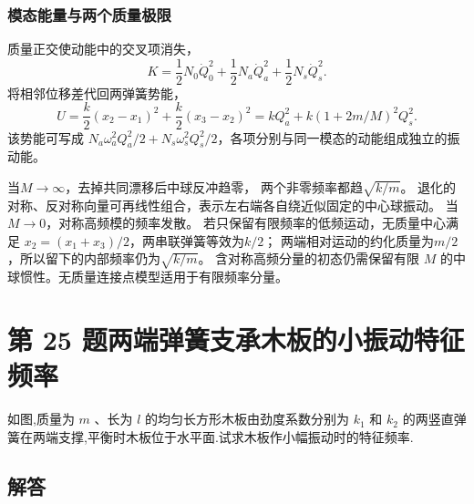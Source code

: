 \documentclass[UTF8,fontset=fandol,a4paper,11pt]{ctexart}
\newcommand{\tagline}[1]{\noindent{\small\color{muted}#1}\par}
\newcommand{\figcaption}[1]{\par\vspace{2pt}{\small\color{muted}#1}\par}
\begin{document}
\subsubsection*{模态能量与两个质量极限}
质量正交使动能中的交叉项消失，
\[
K=\frac12N_0\dot Q_0^2+\frac12N_a\dot Q_a^2+\frac12N_s\dot Q_s^2.
\]
将相邻位移差代回两弹簧势能，
\[
U=\frac k2(x_2-x_1)^2+\frac k2(x_3-x_2)^2
=kQ_a^2+k(1+2m/M)^2Q_s^2.
\]
该势能可写成 $N_a\omega_a^2Q_a^2/2+N_s\omega_s^2Q_s^2/2$，各项分别与同一模态的动能组成独立的振动能。

当$M\to\infty$，去掉共同漂移后中球反冲趋零，
两个非零频率都趋$\sqrt{k/m}$。
退化的对称、反对称向量可再线性组合，表示左右端各自绕近似固定的中心球振动。
当$M\to0$，对称高频模的频率发散。
若只保留有限频率的低频运动，无质量中心满足
$x_2=(x_1+x_3)/2$，两串联弹簧等效为$k/2$；
两端相对运动的约化质量为$m/2$，所以留下的内部频率仍为$\sqrt{k/m}$。
含对称高频分量的初态仍需保留有限 $M$ 的中球惯性。无质量连接点模型适用于有限频率分量。




\section*{第 25 题\quad 两端弹簧支承木板的小振动特征频率}

\tagline{M-07-25}

如图,质量为 \(m\) 、长为 \(l\) 的均匀长方形木板由劲度系数分别为
\(k_{1}\) 和 \(k_{2}\)
的两竖直弹簧在两端支撑,平衡时木板位于水平面.试求木板作小幅振动时的特征频率.

\begin{center}\begin{minipage}{\linewidth}\centering{}\figcaption{图 7.25}\end{minipage}\end{center}

\subsection*{解答}
\end{document}
